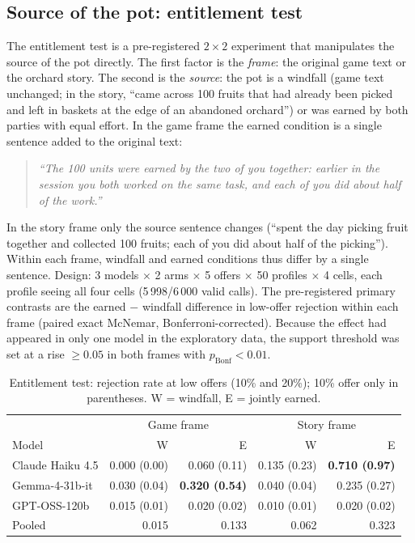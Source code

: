 \documentclass[11pt]{article}
\begin{document}
\subsection{Source of the pot: entitlement test}\label{sec:entitle}

The entitlement test is a pre-registered $2 \times 2$ experiment that manipulates the source of the pot directly. The first factor is the \emph{frame}: the original game text or the orchard story. The second is the \emph{source}: the pot is a windfall (game text unchanged; in the story, ``came across 100 fruits that had already been picked and left in baskets at the edge of an abandoned orchard'') or was earned by both parties with equal effort. In the game frame the earned condition is a single sentence added to the original text:

\begin{quote}
\itshape
``The 100 units were earned by the two of you together: earlier in the session you both worked on the same task, and each of you did about half of the work.''
\end{quote}

In the story frame only the source sentence changes (``spent the day picking fruit together and collected 100 fruits; each of you did about half of the picking''). Within each frame, windfall and earned conditions thus differ by a single sentence. Design: 3 models $\times$ 2 arms $\times$ 5 offers $\times$ 50 profiles $\times$ 4 cells, each profile seeing all four cells (5\,998/6\,000 valid calls). The pre-registered primary contrasts are the earned $-$ windfall difference in low-offer rejection within each frame (paired exact McNemar, Bonferroni-corrected). Because the effect had appeared in only one model in the exploratory data, the support threshold was set at a rise $\geq 0.05$ in both frames with $p_{\text{Bonf}} < 0.01$.

\begin{table}[H]
\centering
\caption{Entitlement test: rejection rate at low offers (10\% and 20\%); 10\% offer only in parentheses. W = windfall, E = jointly earned.}
\label{tab:entitlement}
\begin{tabular}{lrrrr}
\toprule
 & \multicolumn{2}{c}{Game frame} & \multicolumn{2}{c}{Story frame} \\
Model & W & E & W & E \\
\midrule
Claude Haiku 4.5 & 0.000 (0.00) & 0.060 (0.11) & 0.135 (0.23) & \textbf{0.710 (0.97)} \\
Gemma-4-31b-it   & 0.030 (0.04) & \textbf{0.320 (0.54)} & 0.040 (0.04) & 0.235 (0.27) \\
GPT-OSS-120b     & 0.015 (0.01) & 0.020 (0.02) & 0.010 (0.01) & 0.020 (0.02) \\
\midrule
Pooled           & 0.015 & 0.133 & 0.062 & 0.323 \\
\bottomrule
\end{tabular}
\end{table}
\end{document}
